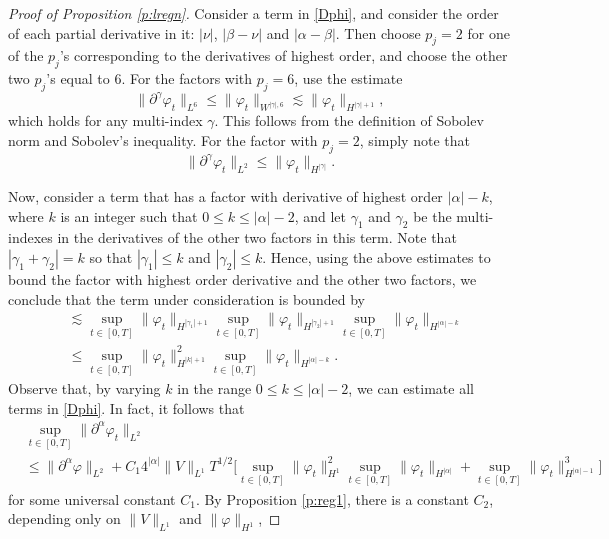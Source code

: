 \documentclass[11pt,a4paper,draft,DIV11]{scrartcl}	%
\begin{document}
\begin{proof}[Proof of Proposition \ref{p:lregn}]
  Consider a term in \eqref{Dphi}, and consider the order of each partial
  derivative in it: $|\nu|$, $|\beta-\nu|$ and $|\alpha-\beta|$. Then choose
  $p_j = 2$ for one of the $p_j$'s corresponding to the derivatives of highest
  order, and choose the other two $p_j$'s equal to $6$. For the factors with
  $p_j = 6$, use the estimate
  \[
    \| \partial^\gamma \varphi_t \|_{L^6} \le \| \varphi_t \|_{W^{|\gamma|,6}}
    \apprle \| \varphi_t \|_{H^{|\gamma|+1}},
  \]
  which holds for any multi-index $\gamma$. This follows from the definition
  of Sobolev norm and Sobolev's inequality. For the factor with $p_j = 2$,
  simply note that
  \[
    \| \partial^\gamma \varphi_t \|_{L^2} \le \| \varphi_t \|_{H^{|\gamma|}}.
  \]


  Now, consider a term that has a factor with derivative of highest order
  $|\alpha| - k$, where $k$ is an integer such that $0 \le k \le |\alpha| -
  2$, and let $\gamma_1$ and $\gamma_2$ be the multi-indexes in the
  derivatives of the other two factors in this term. Note that $|\gamma_1 +
  \gamma_2|=k$ so that $|\gamma_1| \le k$ and $|\gamma_2| \le k$. Hence, using
  the above estimates to bound the factor with highest order derivative and
  the other two factors, we conclude that the term under consideration is
  bounded by
  \begin{align*}
    & \apprle \sup_{t \in [0,T]} \| \varphi_t \|_{H^{|\gamma_1|+1}} \sup_{t
    \in [0,T]} \| \varphi_t \|_{H^{|\gamma_2|+1}} \sup_{t \in [0,T]} \|
    \varphi_t \|_{H^{|\alpha|-k}} \\
    & \le \sup_{t \in [0,T]} \| \varphi_t \|_{H^{|k|+1}}^2 \sup_{t \in [0,T]}
    \| \varphi_t \|_{H^{|\alpha|-k}}.
  \end{align*}
  Observe that, by varying $k$ in the range $0 \le k \le |\alpha|-2$, we can
  estimate all terms in \eqref{Dphi}. In fact, it follows that
  \begin{equation} \label{dal}
    \begin{split}
      & \sup_{t \in [0,T]} \| \partial^\alpha \varphi_t \|_{L^2} \\
      & \le \| \partial^\alpha \varphi \|_{L^2} + C_1 4^{|\alpha|} \| V
      \|_{L^1} T^{1/2} \Big[ \sup_{t \in [0,T]} \| \varphi_t \|_{H^1}^2
      \sup_{t \in [0,T]} \| \varphi_t \|_{H^{|\alpha|}} + \sup_{t \in [0,T]}
      \| \varphi_t \|_{H^{|\alpha|-1}}^3 \Big]
    \end{split}
  \end{equation}
  for some universal constant $C_1$. By Proposition \ref{p:reg1}, there is a
  constant $C_2$, depending only on $\| V \|_{L^1}$ and $\| \varphi \|_{H^1}$,

\end{proof}
\end{document}
